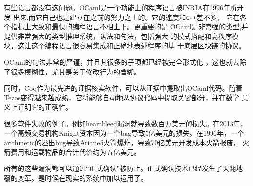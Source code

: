 \documentclass[letterpaper]{article}
\begin{document}
有些语言都没有这问题。OCaml是一个功能上的程序语言被INRIA在1996年所开发
出来,而它自己也是建立在之前的努力之上的。它的速度和\verb!C++!差不多，
它在各个指标上大致和最快的编程语言不相上下\cite{shootout}。更重要的是
OCaml是非常强的类型,并提供非常强大的类型推理系统，语法和句法，包括强大
的模式搭配和高秩序模块，这让这个编程语言很容易集成和正确地表述程序的基
于底层区块链的协议。

OCaml的句法非常的严谨，并且其很多的子项都已经被完全形式化
\cite{semantic}，这也就去除了很多模糊性，尤其是关于修改行为的含糊。

同时，Coq作为最先进的证据核实软件，可以从证据中提取出OCaml代码。随着
Tezos变得越来越成熟，它将能够自动地从协议代码中提取关键部分，并在数学
意义上证明它的正确性。

很多软件失败的例子。例如heartbleed漏洞就导致数百万美元的损失。在2013年，
一个高频交易机构Knight资本因为一个bug导致5亿美元的损失。在1996年，一个
arithmetic的溢出bug导致Ariane5火箭爆炸，导致70亿美元开发成本火箭报废，
火箭费用和运载物品的合计代价约为五亿美元。

所有的这些漏洞都可以通过“正式确认”被防止。正式确认技术已经发生了天翻地
覆的变革。是时候在现实的系统中加以运用了。
\end{document}
